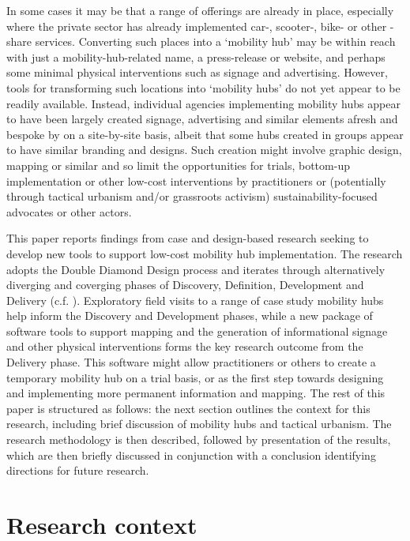 \documentclass[preprint, 3p,
authoryear]{elsarticle} %
\begin{document}
In some cases it may be that a range of offerings are already in place,
especially where the private sector has already implemented car-,
scooter-, bike- or other -share services. Converting such places into a
`mobility hub' may be within reach with just a mobility-hub-related
name, a press-release or website, and perhaps some minimal physical
interventions such as signage and advertising. However, tools for
transforming such locations into `mobility hubs' do not yet appear to be
readily available. Instead, individual agencies implementing mobility
hubs appear to have been largely created signage, advertising and
similar elements afresh and bespoke by on a site-by-site basis, albeit
that some hubs created in groups appear to have similar branding and
designs. Such creation might involve graphic design, mapping or similar
and so limit the opportunities for trials, bottom-up implementation or
other low-cost interventions by practitioners or (potentially through
tactical urbanism and/or grassroots activism) sustainability-focused
advocates or other actors.

This paper reports findings from case and design-based research seeking
to develop new tools to support low-cost mobility hub implementation.
The research adopts the Double Diamond Design process and iterates
through alternatively diverging and coverging phases of Discovery,
Definition, Development and Delivery (c.f.
\cite{UK-Design-Council:0aa}). Exploratory field visits to a range of
case study mobility hubs help inform the Discovery and Development
phases, while a new package of software tools to support mapping and the
generation of informational signage and other physical interventions
forms the key research outcome from the Delivery phase. This software
might allow practitioners or others to create a temporary mobility hub
on a trial basis, or as the first step towards designing and
implementing more permanent information and mapping. The rest of this
paper is structured as follows: the next section outlines the context
for this research, including brief discussion of mobility hubs and
tactical urbanism. The research methodology is then described, followed
by presentation of the results, which are then briefly discussed in
conjunction with a conclusion identifying directions for future
research.

\section{Research context}\label{research-context}
\end{document}
